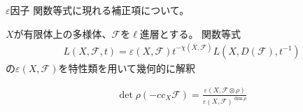 \documentclass[dvipdfmx]{beamer}
\begin{document}
\begin{frame}{$\varepsilon$因子}
  関数等式に現れる補正項について。

  $X$が有限体上の多様体、$\mathcal{F}$を$\ell$進層とする。
  関数等式
  \begin{align*}
    L(X,\mathcal{F},t)=\varepsilon(X,\mathcal{F})t^{-\chi(\overline{X},\mathcal{F})}L(X,D(\mathcal{F}),t^{-1})
  \end{align*}
  の$\varepsilon(X,\mathcal{F})$を特性類を用いて幾何的に解釈

  \begin{thm}
    \begin{align*}
      \det\rho(-cc_X\mathcal{F})=\frac{\varepsilon(X,\mathcal{F}\otimes\rho)}{\varepsilon(X,\mathcal{F})^{\dim\rho}}
    \end{align*}    
  \end{thm}  
\end{frame}
\end{document}
